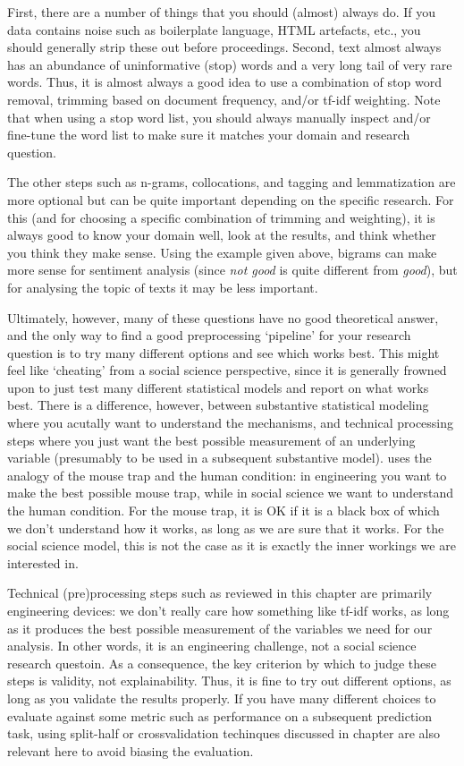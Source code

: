 First, there are a number of things that you should (almost) always do.
If you data contains noise such as boilerplate language, HTML artefacts, etc., you should generally strip these out before proceedings.
Second, text almost always has an abundance of uninformative (stop) words and a very long tail of very rare words.
Thus, it is almost always a good idea to use a combination of stop word removal, trimming based on document frequency, and/or tf-idf weighting.
Note that when using a stop word list, you should always manually inspect and/or fine-tune the word list to make sure it matches your domain and research question.

The other steps such as n-grams, collocations, and tagging and lemmatization are more optional but can be quite important depending on the specific research.
For this (and for choosing a specific combination of trimming and weighting), it is always good to know your domain well, look at the results, and think whether you think they make sense.
Using the example given above, bigrams can make more sense for sentiment analysis (since \emph{not good} is quite different from \emph{good}),
but for analysing the topic of texts it may be less important.

Ultimately, however, many of these questions have no good theoretical answer, and the only way to find a good preprocessing `pipeline' for your research question is to try many different
options and see which works best.
This might feel like `cheating' from a social science perspective, since it is generally frowned upon to just test many different statistical models and report on what works best.
There is a difference, however, between substantive statistical modeling where you acutally want to understand the mechanisms,
and technical processing steps where you just want the best possible measurement of an underlying variable (presumably to be used in a subsequent substantive model).
\citet{mousetrap} uses the analogy of the mouse trap and the human condition: in engineering you want to make the best possible mouse trap, 
while in social science we want to understand the human condition.
For the mouse trap, it is OK if it is a black box of which we don't understand how it works, as long as we are sure that it works.
For the social science model, this is not the case as it is exactly the inner workings we are interested in.

Technical (pre)processing steps such as reviewed in this chapter are primarily engineering devices:
we don't really care how something like tf-idf works, as long as it produces the best possible measurement of the variables we need for our analysis.
In other words, it is an engineering challenge, not a social science research questoin.
As a consequence, the key criterion by which to judge these steps is validity, not explainability.
Thus, it is fine to try out different options, as long as you validate the results properly.
If you have many different choices to evaluate against some metric such as performance on a subsequent prediction task,
using split-half or crossvalidation techinques discussed in chapter  are also relevant here to avoid biasing the evaluation.
